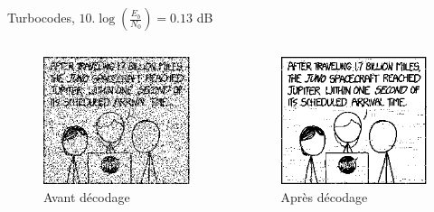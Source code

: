 \documentclass[11pt]{beamer}
\begin{document}
\begin{frame}{Turbocodes, $10.\log(\frac{E_b}{N_0}) = 0.13$ dB}
	\begin{columns}
		\begin{column}{.5\textwidth}
			\begin{figure}
				\includegraphics[scale=0.6]{turbo_noisy_97}\\
				Avant d\'ecodage
			\end{figure}
		\end{column}
		\begin{column}{.5\textwidth}
			\begin{figure}
				\includegraphics[scale=0.6]{turbo_decoded_97}\\
				Apr\`es d\'ecodage
			\end{figure}
		\end{column}
	\end{columns}
\end{frame}
\end{document}
